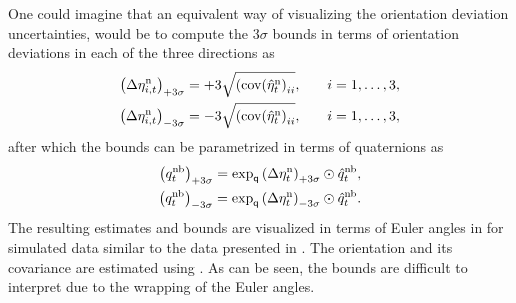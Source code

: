 One could imagine that an equivalent way of visualizing the orientation deviation uncertainties, would be to compute the $3 \sigma$ bounds in terms of orientation deviations in each of the three directions as
\begin{subequations}
\begin{align}
\left( \Delta \eta_{i,t}^\text{n} \right)_{+3 \sigma} &= + 3 \sqrt{\left( \operatorname{cov} (\hat{\eta}_t^\text{n} \right)_{ii}}, \quad & i &= 1, \hdots, 3, \\
\left( \Delta \eta_{i,t}^\text{n} \right)_{-3 \sigma} &= - 3 \sqrt{\left( \operatorname{cov} (\hat{\eta}_t^\text{n} \right)_{ii}}, \quad & i &= 1, \hdots, 3,
\end{align}
\end{subequations}
after which the bounds can be parametrized in terms of quaternions as
\begin{subequations}
\begin{align}
\left( q_t^\text{nb} \right)_{+3 \sigma} = \exp_\mathsf{q} \left( \Delta \eta_{t}^\text{n} \right)_{+3 \sigma} \odot \hat{q}_t^\text{nb}, \\
\left( q_t^\text{nb} \right)_{-3 \sigma} = \exp_\mathsf{q} \left( \Delta \eta_{t}^\text{n} \right)_{-3 \sigma} \odot \hat{q}_t^\text{nb}.
\end{align}
\end{subequations}
The resulting estimates and bounds are visualized in terms of Euler angles in  for simulated data similar to the data presented in . The orientation and its covariance are estimated using . As can be seen, the bounds are difficult to interpret due to the wrapping of the Euler angles. 

